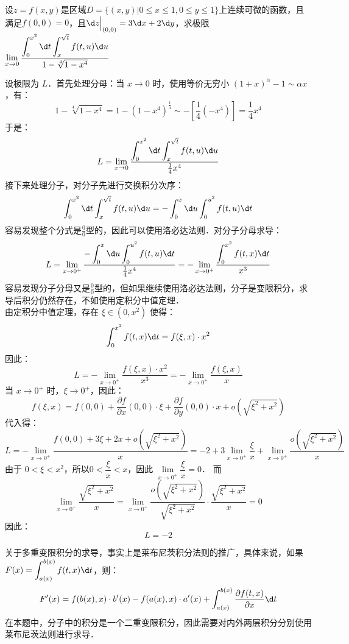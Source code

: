 \documentclass[12pt, a4paper, oneside, UTF8]{ctexbook}
\begin{document}
\begin{exercise}
    设$z=f(x,y)$是区域$D=\{(x,y)|0\le x\le 1,0\le y\le 1\}$上连续可微的函数，且满足$f(0,0)=0$，且$\d z\Big|_{(0,0)}=3\d x+2\d y$，求极限$\displaystyle\lim_{x \to 0} \dfrac{\displaystyle \int_{0}^{x^2}\d t\displaystyle\int_{x}^{\sqrt{t}}f(t,u)\d u}{1-\sqrt[4]{1-x^4}}$
\end{exercise}
\begin{solution}
    设极限为 $L$．首先处理分母：当 $x \to 0$ 时，使用等价无穷小 $(1+x)^\alpha - 1 \sim \alpha x$，有：
    \[ 1 - \sqrt[4]{1-x^4} = 1 - (1 - x^4)^{\frac{1}{4}} \sim -\left[ \frac{1}{4} (-x^4) \right] = \frac{1}{4}x^4 \]
    于是：
    \[ L = \lim_{x \to 0} \frac{\displaystyle\int_{0}^{x^2} \d t \int_{x}^{\sqrt{t}} f(t,u) \d u}{\frac{1}{4}x^4} \]
    接下来处理分子，对分子先进行交换积分次序：
    \[ \int_{0}^{x^2} \d t \int_{x}^{\sqrt{t}} f(t,u) \d u = -\int_{0}^{x}\d u\int_{0}^{u^2} f(t,u) \d t \]
    容易发现整个分式是$\frac{0}{0}$型的，因此可以使用洛必达法则．对分子分母求导：
    \[L = \lim_{x \to 0^+}\frac{-\displaystyle\int_{0}^{x}\d u\int_{0}^{u^2} f(t,u) \d t}{\frac{1}{4}x^4}
        = -\lim_{x \to 0^+}\frac{\displaystyle\int_{0}^{x^2}f(t,x)\d t}{x^3} \]
    容易发现分子分母又是$\frac{0}{0}$型的，但如果继续使用洛必达法则，分子是变限积分，求导后积分仍然存在，不如使用定积分中值定理．\\
    由定积分中值定理，存在 $\xi \in (0, x^2)$ 使得：
    \[ \int_{0}^{x^2} f(t,x) \d t = f(\xi, x) \cdot x^2 \]
    因此：
    \[ L = -\lim_{x \to 0^+} \frac{f(\xi, x) \cdot x^2}{x^3} = -\lim_{x \to 0^+} \frac{f(\xi, x)}{x} \]
    当 $x \to 0^+$ 时，$\xi \to 0^+$，因此：
    \[ f(\xi, x) = f(0,0) + \frac{\partial f}{\partial x}(0,0) \cdot \xi + \frac{\partial f}{\partial y}(0,0) \cdot x + o(\sqrt{\xi^2 + x^2}) \]
    代入得：
    \[ L = -\lim_{x \to 0^+} \frac{f(0,0) + 3\xi + 2x + o(\sqrt{\xi^2 + x^2})}{x}
        = -2 + 3\lim_{x \to 0^+} \frac{\xi}{x}+\lim_{x\to 0^+}\frac{o(\sqrt{\xi^2 + x^2})}{x} \]
    由于 $0 < \xi < x^2$，所以$0 < \dfrac{\xi}{x} < x$，因此 $\lim\limits_{x \to 0^+} \dfrac{\xi}{x} = 0$．
    而 $$\lim_{x \to 0^+} \frac{\sqrt{\xi^2 + x^2}}{x} = \lim_{x \to 0^+} \frac{o(\sqrt{\xi^2 + x^2})}{\sqrt{\xi^2 + x^2}} \cdot \frac{\sqrt{\xi^2 + x^2}}{x} = 0$$
    因此：
    \[ \boxed{L = -2} \]
    
\end{solution}
\begin{myRemark}
    关于多重变限积分的求导，事实上是莱布尼茨积分法则的推广，具体来说，如果 $F(x) = \displaystyle\int_{a(x)}^{b(x)} f(t,x) \d t$，则：
\[ F'(x) = f(b(x), x) \cdot b'(x) - f(a(x), x) \cdot a'(x) + \int_{a(x)}^{b(x)} \frac{\partial f(t,x)}{\partial x} \d t \]
    在本题中，分子中的积分是一个二重变限积分，因此需要对内外两层积分分别使用莱布尼茨法则进行求导．
\end{myRemark}
\ifx\allfiles\undefined
\end{document}
